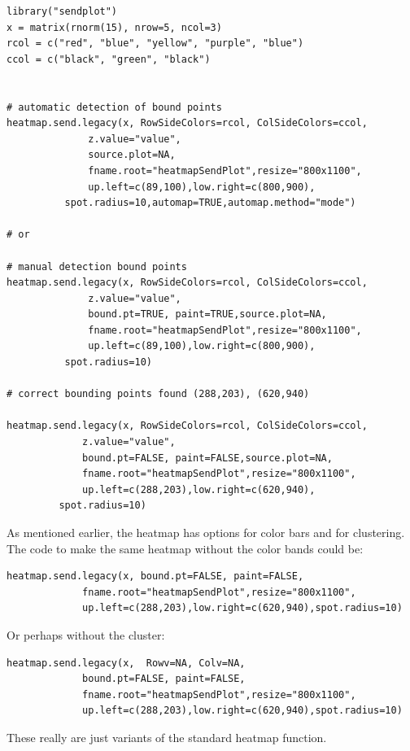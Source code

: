 \documentclass[]{article}
\begin{document}
\begin{verbatim}
library("sendplot")
x = matrix(rnorm(15), nrow=5, ncol=3)
rcol = c("red", "blue", "yellow", "purple", "blue")
ccol = c("black", "green", "black")


# automatic detection of bound points
heatmap.send.legacy(x, RowSideColors=rcol, ColSideColors=ccol,
              z.value="value",
              source.plot=NA,
              fname.root="heatmapSendPlot",resize="800x1100",
              up.left=c(89,100),low.right=c(800,900),
	      spot.radius=10,automap=TRUE,automap.method="mode")

# or 

# manual detection bound points
heatmap.send.legacy(x, RowSideColors=rcol, ColSideColors=ccol,
              z.value="value",
              bound.pt=TRUE, paint=TRUE,source.plot=NA,
              fname.root="heatmapSendPlot",resize="800x1100",
              up.left=c(89,100),low.right=c(800,900),
	      spot.radius=10)

# correct bounding points found (288,203), (620,940)

heatmap.send.legacy(x, RowSideColors=rcol, ColSideColors=ccol,
             z.value="value",
             bound.pt=FALSE, paint=FALSE,source.plot=NA,
             fname.root="heatmapSendPlot",resize="800x1100",
             up.left=c(288,203),low.right=c(620,940),
	     spot.radius=10)

\end{verbatim}

As mentioned earlier, the heatmap has options for color bars and for clustering. The code to make the same heatmap without the color bands could be:

\begin{verbatim}
heatmap.send.legacy(x, bound.pt=FALSE, paint=FALSE, 
             fname.root="heatmapSendPlot",resize="800x1100",
             up.left=c(288,203),low.right=c(620,940),spot.radius=10)
\end{verbatim}

Or perhaps without the cluster:

\begin{verbatim}
heatmap.send.legacy(x,  Rowv=NA, Colv=NA, 
             bound.pt=FALSE, paint=FALSE, 
             fname.root="heatmapSendPlot",resize="800x1100",
             up.left=c(288,203),low.right=c(620,940),spot.radius=10)
\end{verbatim}

These really are just variants of the standard heatmap function. 
\end{document}
